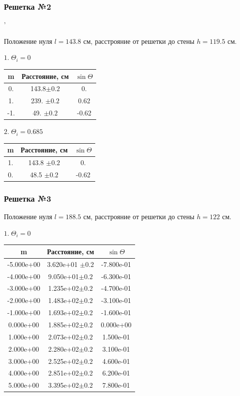 \documentclass[a4paper, 12pt]{article}
\begin{document}
\subsubsection{Решетка №2}'


Положение нуля $l = 143.8$ см, расстрояние от решетки до стены $h = 119.5$ см.



$1. \; \Theta_i = 0$\\
\begin{center}
\begin{tabular}{| c| c | c |}
\hline
m  &  Расстояние, см & $\sin\Theta $\\ 
\hline
0. &  143.8$\pm0.2$    & 0. \\
1. &  239.  $\pm0.2$ &  0.62\\
-1.  & 49.  $\pm0.2$ & -0.62\\
\hline
\end{tabular}
\end{center}


$2. \; \Theta_i = 0.685$\\
\begin{center}
\begin{tabular}{| c| c | c |}
\hline
m  &  Расстояние, см & $\sin\Theta $\\ 
\hline
1. &  143.8 $\pm0.2$  &  0. \\
0.  &  48.5 $\pm0.2$ &  -0.62\\
\hline
\end{tabular}
\end{center}


\subsubsection{Решетка №3}
Положение нуля $l = 188.5$ см, расстрояние от решетки до стены $h = 122$ см.


$1. \; \Theta_i = 0$\\
\begin{center}
\begin{tabular}{| c| c | c |}
\hline
m  &  Расстояние, см & $\sin\Theta $\\ 
\hline
-5.000e+00 & 3.620e+01 $\pm0.2$ & -7.800e-01\\
 -4.000e+00 & 9.050e+01$\pm0.2$  & -6.300e-01\\
 -3.000e+00 & 1.235e+02$\pm0.2$  & -4.700e-01\\
 -2.000e+00 & 1.483e+02$\pm0.2$  & -3.100e-01\\
 -1.000e+00 & 1.693e+02$\pm0.2$  & -1.600e-01\\
  0.000e+00 & 1.885e+02$\pm0.2$  & 0.000e+00\\
  1.000e+00 & 2.073e+02$\pm0.2$  & 1.500e-01\\
  2.000e+00 & 2.280e+02$\pm0.2$  & 3.100e-01\\
  3.000e+00 & 2.525e+02$\pm0.2$  & 4.600e-01\\
  4.000e+00 & 2.851e+02$\pm0.2$  & 6.200e-01\\
  5.000e+00 & 3.395e+02$\pm0.2$  & 7.800e-01\\
\hline
\end{tabular}
\end{center}
\end{document}
